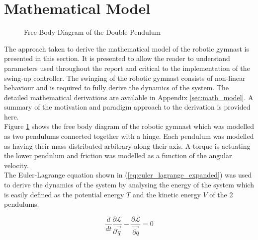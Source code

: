\section{Mathematical Model}
\label{sec:mathematical_model}
\begin{figure}[h]
	\centering
	
	\caption{Free Body Diagram of the Double Pendulum}
	\label{fig:doublePen}
\end{figure}

The approach taken to derive the mathematical model of the robotic gymnast is presented in this section. It is presented to allow the reader to understand parameters used throughout the report and critical to the implementation of the swing-up controller. The swinging of the robotic gymnast consists of non-linear behaviour and is required to fully derive the dynamics of the system. The detailed mathematical derivations are available in Appendix \ref{sec:math_model}. A summary of the motivation and paradigm approach to the derivation is provided here.\\

 Figure \ref{fig:doublePen} shows the free body diagram of the robotic gymnast which was modelled as two pendulums connected together with a hinge. Each pendulum was modelled as having their mass distributed arbitrary along their axis. A torque is actuating the lower pendulum and friction was modelled as a function of the angular velocity.\\

The Euler-Lagrange equation shown in (\ref{eq:euler_lagrange_expanded}) was used to derive the dynamics of the system by analysing the energy of the system which is easily defined as the potential energy $T$ and the kinetic energy $V$ of the 2 pendulums.
 
\begin{equation} \label{eq:euler_lagrange_expanded}
\frac{d}{dt}\frac{\partial\mathcal{L}}{\partial\vec{\dot{q}}}-\frac{\partial\mathcal{L}}{ \vec{\partial q}} = 0
\end{equation}

